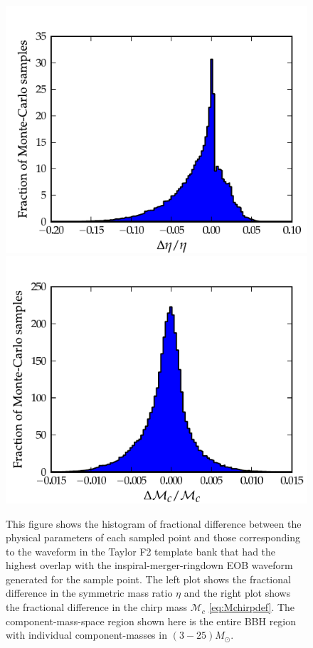 \documentclass[aps,
prd,
amsmath,
amssymb,
twocolumn,
floatfix,
groupedaddress]{revtex4-1}
\begin{document}
\begin{figure}[]
\centerline{
\includegraphics[scale=0.04, clip=false,keepaspectratio=true, width=\columnwidth]{hist_eta_err14paramF2EOB.pdf}\label{fig:errparams_f2eob_eta}              
\includegraphics[scale=0.04, clip=false, keepaspectratio=true, width=\columnwidth]{hist_mchirp_err14paramF2EOB.pdf}\label{fig:errparams_f2eob_mchirp}
}
\caption{This figure shows the histogram of fractional difference between the physical parameters of each sampled point and those corresponding to the waveform in the Taylor F2 template bank that had the highest overlap with the inspiral-merger-ringdown EOB waveform generated for the sample point. The left plot shows the fractional difference in the symmetric mass ratio $\eta$ and the right plot shows the fractional difference in the chirp mass $\mathcal{M}_c$ \eqref{eq:Mchirpdef}. The component-mass-space region shown here is the entire BBH region with individual component-masses in $(3-25)M_{\odot}$.}
\label{fig:errparams_f2eob}
\end{figure}
\end{document}
